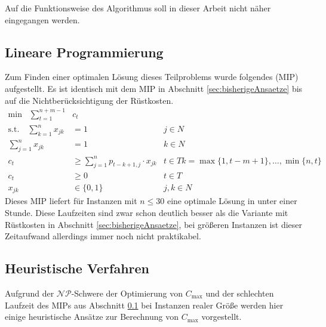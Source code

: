 \documentclass{scrreprt}
\begin{document}
Auf die Funktionsweise des Algorithmus soll in dieser Arbeit nicht näher eingegangen werden.


\subsection{Lineare Programmierung}
\label{subsec:LineareProgrammierung}
Zum Finden einer optimalen Lösung dieses Teilproblems wurde folgendes (MIP) aufgestellt.
Es ist identisch mit dem MIP in Abschnitt \ref{sec:bisherigeAnsaetze} bis auf die Nichtberücksichtigung der Rüstkosten.
\begin{align}
    \text{min} \quad \sum_{t=1}^{n+m-1} &c_t \\
    \text{s.t.}\quad \sum_{k=1}^n x_{jk} &= 1 & j\in N \\
                     \sum_{j=1}^n x_{jk} &= 1 & k\in N \\
    c_t &\geq \sum_{j=1}^n p_{t-k+1,j} \cdot x_{jk} & t\in T k=\max\{1,t-m+1\},\ldots,\min\{n,t\} \\
    c_t &\geq 0 & t\in T \\
    x_{jk} &\in \{0,1\} & j,k\in N
\end{align}
Dieses MIP liefert für Instanzen mit $n\leq 30$ eine optimale Lösung in unter einer Stunde.
Diese Laufzeiten sind zwar schon deutlich besser als die Variante mit Rüstkosten in Abschnitt \ref{sec:bisherigeAnsaetze},
bei größeren Instanzen ist dieser Zeitaufwand allerdings immer noch nicht praktikabel. 


\subsection{Heuristische Verfahren}
\label{subsec:HeuristischeVerfahren}
Aufgrund der $\mathcal{NP}$-Schwere der Optimierung von $C_{\max}$ und der schlechten Laufzeit des MIPs aus Abschnitt \ref{subsec:LineareProgrammierung}
bei Instanzen realer Größe werden hier einige heuristische Ansätze zur Berechnung von $C_{\max}$ vorgestellt.
\end{document}
